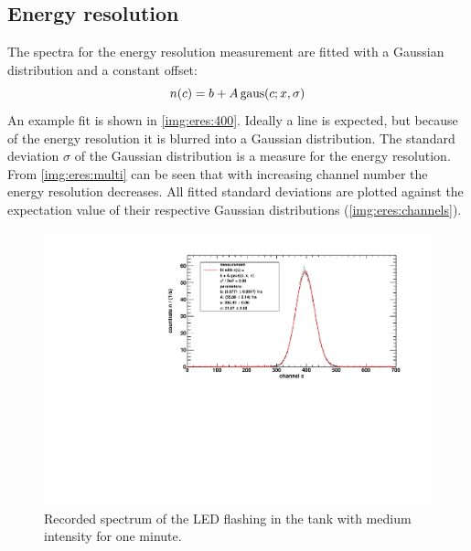 \subsection{Energy resolution}
The spectra for the energy resolution measurement are fitted with a Gaussian distribution and a constant offset:
\begin{equation}
    n(c) = b + A \operatorname{gaus}(c;x,\sigma)
\end{equation}
An example fit is shown in \autoref{img:eres:400}. Ideally a line is expected, but because of the energy resolution it is blurred into a Gaussian 
distribution. The standard deviation $\sigma$ of the Gaussian distribution is a measure for the energy resolution. 
From \autoref{img:eres:multi} can be seen that with increasing channel number the energy resolution decreases. All fitted standard deviations are 
plotted against the expectation value of their respective Gaussian distributions (\autoref{img:eres:channels}).
\begin{figure}[H]
\begin{center}
  \includegraphics[width=\textwidth]{../img/energieaufloesung_400.pdf}
  \caption{Recorded spectrum of the LED flashing in the tank with medium intensity for one minute.}
  \label{img:eres:400}
\end{center}
\end{figure}

